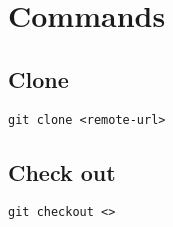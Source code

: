 
\chapter{Commands}
\label{cha:commands}

\section{Clone}
\label{sec:clone}

\begin{lstlisting}
git clone <remote-url>
\end{lstlisting}


\section{Check out}
\label{sec:check-out}

\begin{lstlisting}
git checkout <>

\end{lstlisting}
